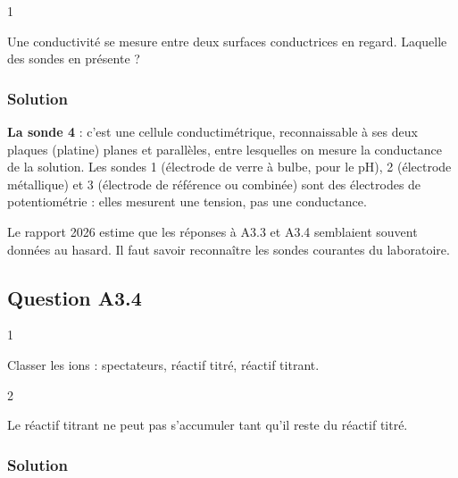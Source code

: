 \documentclass[11pt,a4paper]{article}
\begin{document}
\begin{indication}{1}

Une conductivité se mesure entre deux surfaces conductrices en regard. Laquelle des sondes en présente ?

\end{indication}

\hypertarget{solution-18}{%
\subsubsection{Solution}\label{solution-18}}

\textbf{La sonde 4} : c'est une cellule conductimétrique, reconnaissable à ses deux plaques (platine) planes et parallèles, entre lesquelles on mesure la conductance de la solution. Les sondes 1 (électrode de verre à bulbe, pour le pH), 2 (électrode métallique) et 3 (électrode de référence ou combinée) sont des électrodes de potentiométrie : elles mesurent une tension, pas une conductance.

\begin{jury}

Le rapport 2026 estime que les réponses à A3.3 et A3.4 semblaient souvent données au hasard. Il faut savoir reconnaître les sondes courantes du laboratoire.

\end{jury}

\hypertarget{question-a3.4}{%
\subsection{Question A3.4}\label{question-a3.4}}

\begin{indication}{1}

Classer les ions : spectateurs, réactif titré, réactif titrant.

\end{indication}

\begin{indication}{2}

Le réactif titrant ne peut pas s'accumuler tant qu'il reste du réactif titré.

\end{indication}

\hypertarget{solution-19}{%
\subsubsection{Solution}\label{solution-19}}
\end{document}
